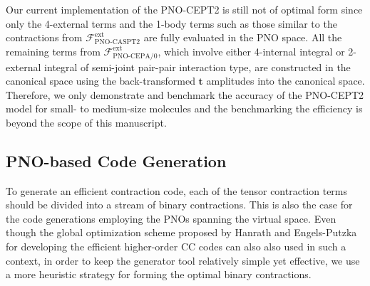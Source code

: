\documentclass[aip,jcp,amsmath,twocolumn,floatfix,reprint,fleqn]{revtex4-1}
\begin{document}
%
Our current implementation of the PNO-CEPT2 is still not of optimal form since only the 4-external terms and the 1-body terms such as those similar to the contractions from $\mathscr{F}_\text{PNO-CASPT2}^\text{ext}$ are fully evaluated in the PNO space.
%
All the remaining terms from $\mathscr{F}_\text{PNO-CEPA/0}^\text{ext}$, which involve either 4-internal integral or 2-external integral of semi-joint pair-pair interaction type,\cite{neeseefficient2009cepa,neeseefficient2009} are constructed in the canonical space using the back-transformed $\mathbf{t}$ amplitudes into the canonical space.
%
Therefore, we only demonstrate and benchmark the accuracy of the PNO-CEPT2 model for small- to medium-size molecules and the benchmarking the efficiency is beyond the scope of this manuscript.

\subsection{PNO-based Code Generation}
%
To generate an efficient contraction code, each of the tensor contraction terms should be divided into a stream of binary contractions.
%
This is also the case for the code generations employing the PNOs spanning the virtual space.
%
Even though the global optimization scheme proposed by Hanrath and Engels-Putzka for developing the efficient higher-order CC codes\cite{hanrathan2010,engels-putzkaa2011} can also also used in such a context, in order to keep the generator tool relatively simple yet effective, we use a more heuristic strategy for forming the optimal binary contractions.
\end{document}
